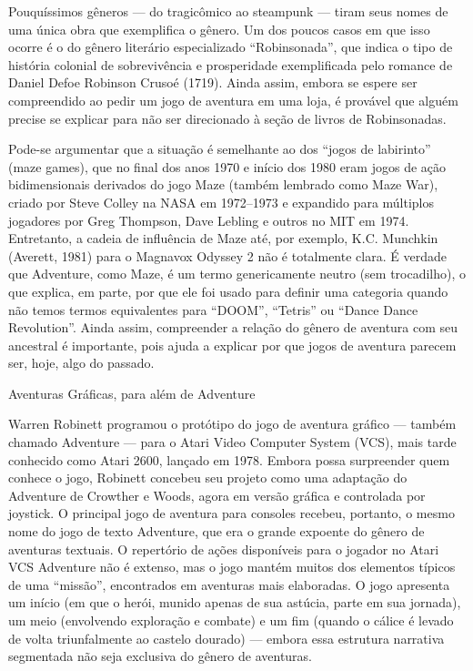 \documentclass[12pt,a4paper]{article}
\begin{document}
Pouquíssimos gêneros — do tragicômico ao steampunk — tiram seus nomes de uma única obra que exemplifica o gênero. Um dos poucos casos em que isso ocorre é o do gênero literário especializado “Robinsonada”, que indica o tipo de história colonial de sobrevivência e prosperidade exemplificada pelo romance de Daniel Defoe Robinson Crusoé (1719). Ainda assim, embora se espere ser compreendido ao pedir um jogo de aventura em uma loja, é provável que alguém precise se explicar para não ser direcionado à seção de livros de Robinsonadas.

Pode-se argumentar que a situação é semelhante ao dos “jogos de labirinto” (maze games), que no final dos anos 1970 e início dos 1980 eram jogos de ação bidimensionais derivados do jogo Maze (também lembrado como Maze War), criado por Steve Colley na NASA em 1972–1973 e expandido para múltiplos jogadores por Greg Thompson, Dave Lebling e outros no MIT em 1974. Entretanto, a cadeia de influência de Maze até, por exemplo, K.C. Munchkin (Averett, 1981) para o Magnavox Odyssey 2 não é totalmente clara. É verdade que Adventure, como Maze, é um termo genericamente neutro (sem trocadilho), o que explica, em parte, por que ele foi usado para definir uma categoria quando não temos termos equivalentes para “DOOM”, “Tetris” ou “Dance Dance Revolution”.
Ainda assim, compreender a relação do gênero de aventura com seu ancestral é importante, pois ajuda a explicar por que jogos de aventura parecem ser, hoje, algo do passado.

Aventuras Gráficas, para além de Adventure

Warren Robinett programou o protótipo do jogo de aventura gráfico — também chamado Adventure — para o Atari Video Computer System (VCS), mais tarde conhecido como Atari 2600, lançado em 1978. Embora possa surpreender quem conhece o jogo, Robinett concebeu seu projeto como uma adaptação do Adventure de Crowther e Woods, agora em versão gráfica e controlada por joystick.
O principal jogo de aventura para consoles recebeu, portanto, o mesmo nome do jogo de texto Adventure, que era o grande expoente do gênero de aventuras textuais. O repertório de ações disponíveis para o jogador no Atari VCS Adventure não é extenso, mas o jogo mantém muitos dos elementos típicos de uma “missão”, encontrados em aventuras mais elaboradas.
O jogo apresenta um início (em que o herói, munido apenas de sua astúcia, parte em sua jornada), um meio (envolvendo exploração e combate) e um fim (quando o cálice é levado de volta triunfalmente ao castelo dourado) — embora essa estrutura narrativa segmentada não seja exclusiva do gênero de aventuras.
\end{document}

